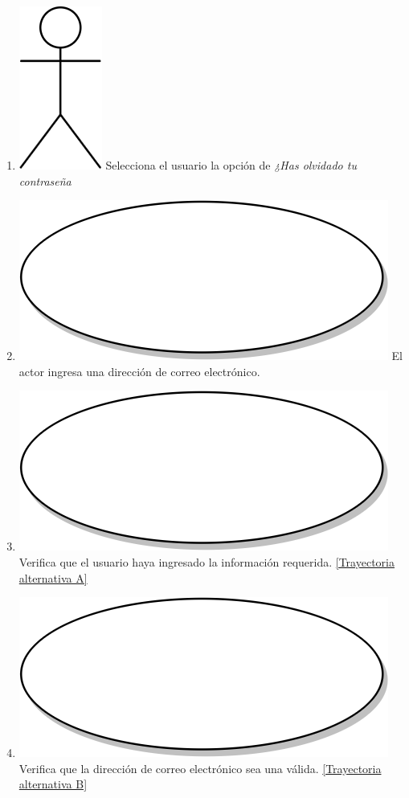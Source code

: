 \begin{enumerate}
  \item {\includegraphics[scale=.1]{Capitulo3/img/actor.png} Selecciona el usuario la opción de \textit{¿Has olvidado tu contraseña}}
  \item {\includegraphics[scale=.05]{Capitulo3/img/proceso.png} El actor ingresa una dirección de correo electrónico.}
  \item {\includegraphics[scale=.05]{Capitulo3/img/proceso.png} Verifica que el usuario haya ingresado la información requerida. \hyperref[cu1_1_ta_a]{[Trayectoria alternativa A]}}
  \item {\includegraphics[scale=.05]{Capitulo3/img/proceso.png} Verifica que la dirección de correo electrónico sea una válida. \hyperref[cu1_1_ta_b]{[Trayectoria alternativa B]}}

\end{enumerate}
